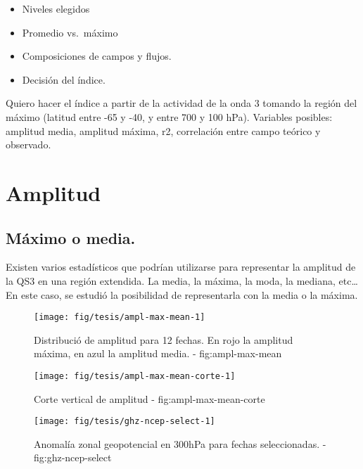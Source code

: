 \documentclass[spanish,a4paper]{book}
\providecommand{\tightlist}{%
  \setlength{\itemsep}{0pt}\setlength{\parskip}{0pt}}
\begin{document}
\begin{itemize}
\tightlist
\item
  Niveles elegidos
\item
  Promedio vs.~máximo
\item
  Composiciones de campos y flujos.
\item
  Decisión del índice.
\end{itemize}

Quiero hacer el índice a partir de la actividad de la onda 3 tomando la
región del máximo (latitud entre -65 y -40, y entre 700 y 100 hPa).
Variables posibles: amplitud media, amplitud máxima, r2, correlación
entre campo teórico y observado.

\section{Amplitud}\label{amplitud}

\subsection{Máximo o media.}\label{maximo-o-media.}

Existen varios estadísticos que podrían utilizarse para representar la
amplitud de la QS3 en una región extendida. La media, la máxima, la
moda, la mediana, etc\ldots{} En este caso, se estudió la posibilidad de
representarla con la media o la
máxima.

\begin{figure*}
\texttt{[image: fig/tesis/ampl-max-mean-1]} \caption{Distribució de amplitud para 12 fechas. En rojo la amplitud máxima, en azul la amplitud media. - fig:ampl-max-mean}\label{fig:ampl-max-mean}
\end{figure*}

\begin{figure*}
\texttt{[image: fig/tesis/ampl-max-mean-corte-1]} \caption{Corte vertical de amplitud - fig:ampl-max-mean-corte}\label{fig:ampl-max-mean-corte}
\end{figure*}

\begin{figure*}
\texttt{[image: fig/tesis/ghz-ncep-select-1]} \caption{Anomalía zonal geopotencial en 300hPa para fechas seleccionadas. - fig:ghz-ncep-select}\label{fig:ghz-ncep-select}
\end{figure*}
\end{document}
